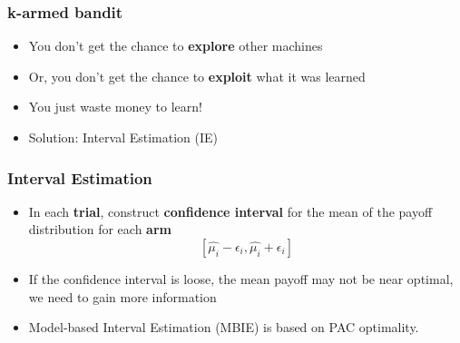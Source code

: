 \documentclass{beamer}
\begin{document}
\begin{frame}
	\frametitle{k-armed bandit}
	\begin{itemize}
		\item You don't get the chance to \textbf{explore} other machines
		\item Or, you don't get the chance to \textbf{exploit} what it was learned
		\item You just waste money to learn!
		\item Solution: Interval Estimation (IE)
	\end{itemize}

\end{frame}

\begin{frame}
	\frametitle{Interval Estimation}
	\begin{itemize}
		\item In each \textbf{trial}, construct \textbf{confidence interval} for the mean of the payoff distribution for each \textbf{arm}
		$$ [\hat{\mu_i} - \epsilon_i, \hat{\mu_i} + \epsilon_i] $$
		\item If the confidence interval is loose, the mean payoff may not be near optimal, we need to gain more information
		\item Model-based Interval Estimation (MBIE) is based on PAC optimality.
	\end{itemize}

\end{frame}
\end{document}
